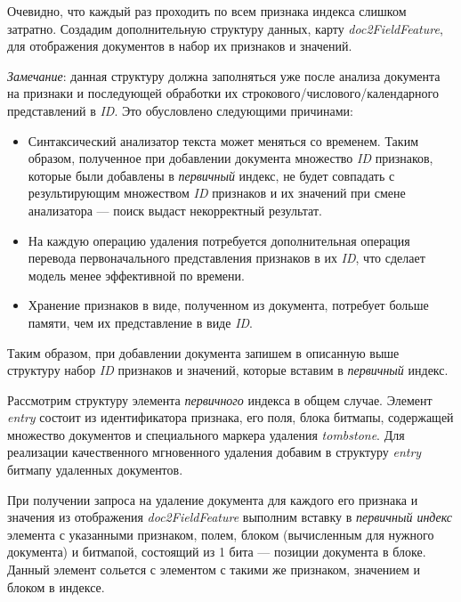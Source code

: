Очевидно, что каждый раз проходить по всем признака индекса слишком затратно. Создадим
дополнительную структуру данных, карту \textit{doc2FieldFeature}, для отображения
документов в набор их признаков и значений. 

\textit{Замечание}: данная структуру должна заполняться уже после анализа документа на
признаки и последующей обработки их строкового/числового/календарного
представлений в \textit{ID}. Это обусловлено следующими причинами:
\begin{itemize}
    \item Синтаксический анализатор текста может меняться со временем. Таким образом,
    полученное при добавлении документа множество \textit{ID} признаков,
    которые были добавлены в \textit{первичный} индекс, не будет совпадать с
    результирующим множеством \textit{ID} признаков и их значений при смене
    анализатора — поиск выдаст некорректный результат.
    \item На каждую операцию удаления потребуется дополнительная операция перевода
    первоначального представления признаков в их \textit{ID}, что сделает
    модель менее эффективной по времени.
    \item Хранение признаков в виде, полученном из документа, потребует больше
    памяти, чем их представление в виде \textit{ID}.
\end{itemize}

Таким образом, при добавлении документа запишем в описанную выше структуру набор
\textit{ID} признаков и значений, которые вставим в \textit{первичный} индекс.

Рассмотрим структуру элемента \textit{первичного} индекса в общем случае. Элемент
\textit{entry} состоит из идентификатора признака, его поля, блока битмапы,
содержащей множество документов и специального маркера удаления
\textit{tombstone}. Для реализации качественного мгновенного удаления добавим в
структуру \textit{entry} битмапу удаленных документов.

При получении запроса на удаление документа для каждого его признака и
значения из отображения \textit{doc2FieldFeature} выполним вставку в
\textit{первичный индекс} элемента с указанными признаком, полем, блоком
(вычисленным для нужного документа) и битмапой, состоящий из 1 бита — позиции
документа в блоке. Данный элемент сольется с элементом с такими же признаком,
значением и блоком в индексе.

